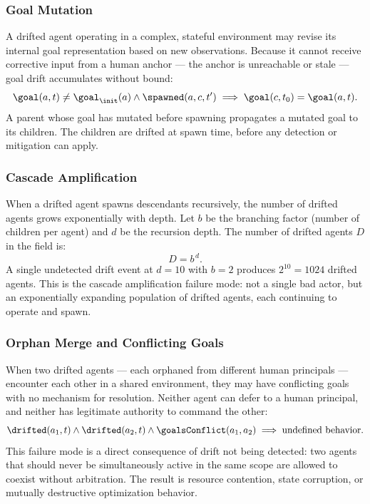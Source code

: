 \subsubsection{Goal Mutation}

A drifted agent operating in a complex, stateful environment may revise its internal goal representation based on new observations. Because it cannot receive corrective input from a human anchor — the anchor is unreachable or stale — goal drift accumulates without bound:
\begin{equation}
\goal(a, t) \neq \goal_{\init}(a) \land \spawned(a, c, t') \implies \goal(c, t_0) = \goal(a, t).
\end{equation}
A parent whose goal has mutated before spawning propagates a mutated goal to its children. The children are drifted at spawn time, before any detection or mitigation can apply.

\subsubsection{Cascade Amplification}

When a drifted agent spawns descendants recursively, the number of drifted agents grows exponentially with depth. Let $b$ be the branching factor (number of children per agent) and $d$ be the recursion depth. The number of drifted agents $D$ in the field is:
\begin{equation}
D = b^{\,d}.
\label{eq:cascade-amplification}
\end{equation}
A single undetected drift event at $d = 10$ with $b = 2$ produces $2^{10} = 1024$ drifted agents. This is the cascade amplification failure mode: not a single bad actor, but an exponentially expanding population of drifted agents, each continuing to operate and spawn.

\subsubsection{Orphan Merge and Conflicting Goals}

When two drifted agents — each orphaned from different human principals — encounter each other in a shared environment, they may have conflicting goals with no mechanism for resolution. Neither agent can defer to a human principal, and neither has legitimate authority to command the other:
\begin{equation}
\drifted(a_1, t) \land \drifted(a_2, t) \land \goalsConflict(a_1, a_2) \implies \text{undefined behavior}.
\end{equation}
This failure mode is a direct consequence of drift not being detected: two agents that should never be simultaneously active in the same scope are allowed to coexist without arbitration. The result is resource contention, state corruption, or mutually destructive optimization behavior.

